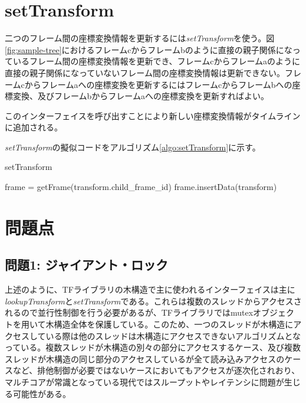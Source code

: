 \documentclass[a4paper]{jreport}	%
\begin{document}


\section{setTransform}
二つのフレーム間の座標変換情報を更新するには\textit{setTransform}を使う。図\ref{fig:sample-tree}におけるフレームcからフレームbのように直接の親子関係になっているフレーム間の座標変換情報を更新でき、フレームcからフレームaのように直接の親子関係になっていないフレーム間の座標変換情報は更新できない。フレームcからフレームaへの座標変換を更新するにはフレームcからフレームbへの座標変換、及びフレームbからフレームaへの座標変換を更新すればよい。

このインターフェイスを呼び出すことにより新しい座標変換情報がタイムラインに追加される。

\textit{setTransform}の擬似コードをアルゴリズム\ref{algo:setTransform}に示す。


\begin{algorithm}
\caption{setTransform}\label{algo:setTransform}
\begin{algorithmic}[1]
	 
	\State frame = getFrame(transform.child\_frame\_id)
	\State frame.insertData(transform)
	\EndProcedure
\end{algorithmic}
\end{algorithm}

\section{問題点}
\subsection*{問題1: ジャイアント・ロック}
上述のように、TFライブラリの木構造で主に使われるインターフェイスは主に\textit{lookupTransform}と\textit{setTransform}である。これらは複数のスレッドからアクセスされるので並行性制御を行う必要があるが、TFライブラリではmutexオブジェクトを用いて木構造全体を保護している。このため、一つのスレッドが木構造にアクセスしている際は他のスレッドは木構造にアクセスできないアルゴリズムとなっている。複数スレッドが木構造の別々の部分にアクセスするケース、及び複数スレッドが木構造の同じ部分のアクセスしているが全て読み込みアクセスのケースなど、排他制御が必要ではないケースにおいてもアクセスが逐次化されおり、マルチコアが常識となっている現代ではスループットやレイテンシに問題が生じる可能性がある。
\end{document}

